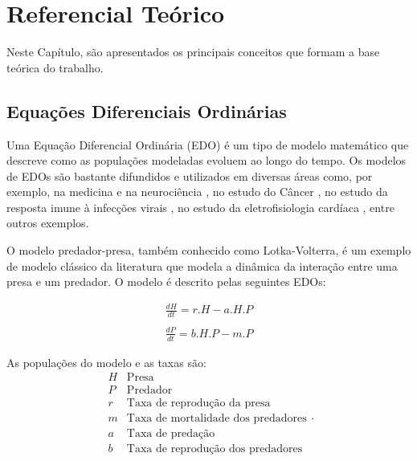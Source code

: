 \documentclass[
	12pt,				%
	openright,			%
	oneside,			%
	a4paper,			%
	main=brazil,
	english,			%
	]{ufsj-abntex2}
\begin{document}
\chapter{Referencial Teórico}
\label{chap:referencial}

Neste Capítulo, são apresentados os principais conceitos que formam a base teórica do trabalho. 

\section{Equações Diferenciais Ordinárias}\label{sec:edos}

Uma Equação Diferencial Ordinária (EDO) é um tipo de modelo matemático que descreve como as populações modeladas evoluem ao longo do tempo. Os modelos de EDOs são bastante difundidos e utilizados em diversas áreas como, por exemplo, na medicina e na neurociência \cite{ADOMIAN1995107}, no estudo do Câncer \cite{spencer2004ordinary, talkington2018ordinary}, no estudo da resposta imune à infecções virais \cite{reis2021validated}, no estudo da eletrofisiologia cardíaca \cite{VIGMOND20083, bucelli2022mathematical}, entre outros exemplos. 

O modelo predador-presa, também conhecido como Lotka-Volterra, é um exemplo de modelo clássico da literatura que modela a dinâmica da interação entre uma presa e um predador. O modelo é descrito pelas seguintes EDOs: 

\begin{equation}\label{eq:predadorpresa}
    \begin{array}{lr}
    \frac{dH}{dt} = r.H - a.H.P
    \\
    \\
    \frac{dP}{dt} = b.H.P - m.P
    \end{array}
\end{equation}

As populações do modelo e as taxas são: 
\[
    \begin{array}{lr}
    H & \text{Presa}\\
    P & \text{Predador}\\
    r & \text{Taxa de reprodução da presa}\\
    m & \text{Taxa de mortalidade dos predadores}\\
    a & \text{Taxa de predação}\\
    b & \text{Taxa de reprodução dos predadores}\\
    \end{array}.
\]
\end{document}
